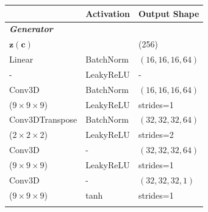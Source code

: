 \documentclass[twocolumn]{article}
\numberwithin{equation}{section}
\begin{document}
\begin{table}[h!]
\centering
\begin{tabularx}{\columnwidth}{@{}YYY@{}}%
 \hline
 & \textbf{Activation} & \textbf{Output Shape}  \\ %
 \hline\hline
 \bf{\textit{Generator}} & & \\
 \hline\hline
$\mathbf{z}(\mathbf{c})$ & &  (256) \\
 \hline
Linear & BatchNorm  & $(16, 16, 16, 64)$ \\ 
    - &  LeakyReLU & - \\ 
 \hline
 Conv3D & BatchNorm  & $(16, 16, 16, 64)$ \\ 
     ($9\times9\times9$)&  LeakyReLU  & strides=1 \\
 \hline
Conv3DTranspose & BatchNorm  & $(32, 32, 32, 64)$ \\ 
    ($2\times2\times2$)& LeakyReLU & strides=2 \\
 \hline
Conv3D  & - & $(32, 32, 32, 64)$ \\ 
 ($9\times9\times9$)& LeakyReLU & strides=1 \\ [1ex] 
 \hline\hline
Conv3D  & - & $(32, 32, 32, 1)$ \\ 
 ($9\times9\times9$)& tanh & strides=1 \\ [1ex] 
 
 \hline
 \\
 \hline\hline
 

\end{tabularx}
\end{table}
\end{document}
